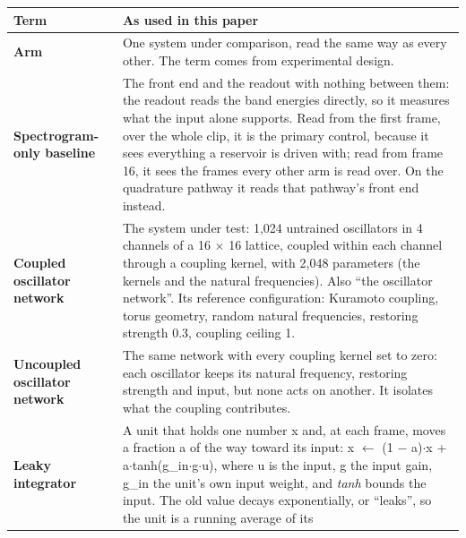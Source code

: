 \documentclass[10pt]{article}
\newcounter{none} %
\begin{document}
{\def\LTcaptype{none} %
\begin{longtable}[]{@{}
  >{\raggedright\arraybackslash}p{}
  >{\raggedright\arraybackslash}p{}@{}}
\toprule\noalign{}
\begin{minipage}[b]{\linewidth}\raggedright
Term
\end{minipage} & \begin{minipage}[b]{\linewidth}\raggedright
As used in this paper
\end{minipage} \\
\midrule\noalign{}
\endhead
\bottomrule\noalign{}
\endlastfoot
\textbf{Arm} & One system under comparison, read the same way as every
other. The term comes from experimental design. \\
\cmidrule{1-2}\textbf{Spectrogram-only baseline} & The front end and the
readout with nothing between them: the readout reads the band energies
directly, so it measures what the input alone supports. Read from the
first frame, over the whole clip, it is the primary control, because it
sees everything a reservoir is driven with; read from frame 16, it sees
the frames every other arm is read over. On the quadrature pathway it
reads that pathway's front end instead. \\
\cmidrule{1-2}\textbf{Coupled oscillator network} & The system under
test: 1,024 untrained oscillators in 4 channels of a 16
\ensuremath{\times} 16 lattice, coupled within each channel through a
coupling kernel, with 2,048 parameters (the kernels and the natural
frequencies). Also ``the oscillator network''. Its reference
configuration: Kuramoto coupling, torus geometry, random natural
frequencies, restoring strength 0.3, coupling ceiling 1. \\
\cmidrule{1-2}\textbf{Uncoupled oscillator network} & The same network
with every coupling kernel set to zero: each oscillator keeps its
natural frequency, restoring strength and input, but none acts on
another. It isolates what the coupling contributes. \\
\cmidrule{1-2}\textbf{Leaky integrator} & A unit that holds one number x
and, at each frame, moves a fraction a of the way toward its input: x
\ensuremath{\leftarrow} (1 \ensuremath{-} a)\ensuremath{\cdot}x +
a\ensuremath{\cdot}tanh(g\_in\ensuremath{\cdot}g\ensuremath{\cdot}u),
where u is the input, g the input gain, g\_in the unit's own input
weight, and \emph{tanh} bounds the input. The old value decays
exponentially, or ``leaks'', so the unit is a running average of its

\end{longtable}}
\end{document}
